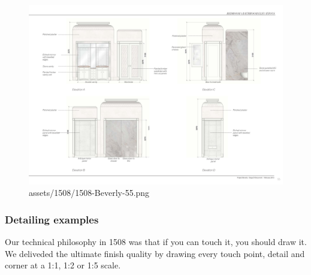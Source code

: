 \documentclass[
]{article}
\begin{document}
\begin{figure}[H]

{\centering \includegraphics{assets/1508/1508-Beverly-55.png}

}

\caption{assets/1508/1508-Beverly-55.png}

\end{figure}%

\subsubsection{Detailing examples}\label{detailing-examples}

Our technical philosophy in 1508 was that if you can touch it, you
should draw it. We deliveded the ultimate finish quality by drawing
every touch point, detail and corner at a 1:1, 1:2 or 1:5 scale.
\end{document}
